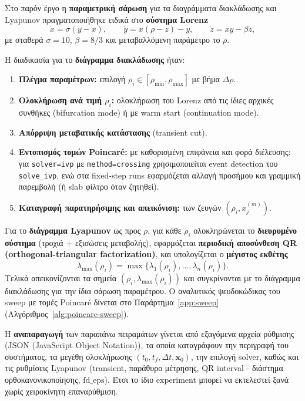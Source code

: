 \documentclass[11pt,a4paper]{report}
\begin{document}
Στο παρόν έργο η \textbf{παραμετρική σάρωση} για τα διαγράμματα διακλάδωσης και Lyapunov
πραγματοποιήθηκε ειδικά στο \textbf{σύστημα Lorenz}
\begin{equation}
\dot{x}=\sigma(y-x),
\qquad
\dot{y}=x(\rho-z)-y,
\qquad
\dot{z}=xy-\beta z,
\end{equation}
με σταθερά $\sigma=10$, $\beta=8/3$ και μεταβαλλόμενη παράμετρο το $\rho$.

Η διαδικασία για το \textbf{διάγραμμα διακλάδωσης} ήταν:
\begin{enumerate}
  \item \textbf{Πλέγμα παραμέτρων:} επιλογή $\rho_i\in[\rho_{\min},\rho_{\max}]$ με βήμα $\Delta\rho$.
  \item \textbf{Ολοκλήρωση ανά τιμή $\rho_i$:} ολοκλήρωση του Lorenz από τις ίδιες αρχικές συνθήκες (bifurcation mode) ή με warm start (continuation mode).
  \item \textbf{Απόρριψη μεταβατικής κατάστασης} (transient cut).
  \item \textbf{Εντοπισμός τομών Poincar\'e:} με καθορισμένη επιφάνεια και φορά διέλευσης: για \texttt{solver=ivp} με \texttt{method=crossing} χρησιμοποιείται event detection του \texttt{solve\_ivp}, ενώ στα fixed-step runs εφαρμόζεται αλλαγή προσήμου και γραμμική παρεμβολή (ή slab φίλτρο όταν ζητηθεί).
  \item \textbf{Καταγραφή παρατηρήσιμης και απεικόνιση:} των ζευγών $(\rho_i, x_j^{(m)})$.
\end{enumerate}

Για το \textbf{διάγραμμα Lyapunov} ως προς $\rho$, για κάθε $\rho_i$ ολοκληρώνεται το
\textbf{διευρυμένο σύστημα} (τροχιά + εξισώσεις μεταβολής), εφαρμόζεται \textbf{περιοδική αποσύνθεση QR (orthogonal-triangular factorization)},
και υπολογίζεται ο \textbf{μέγιστος εκθέτης}
\begin{equation}
\lambda_{\max}(\rho_i)=\max\{\lambda_1(\rho_i),\dots,\lambda_n(\rho_i)\}.
\end{equation}
Τελικά απεικονίζονται τα σημεία $(\rho_i,\lambda_{\max}(\rho_i))$ και συγκρίνονται
με το διάγραμμα διακλάδωσης για την ίδια σάρωση παραμέτρου.
Ο αναλυτικός ψευδοκώδικας του sweep με τομές Poincar\'e δίνεται στο
Παράρτημα~\ref{app:sweep} (Αλγόριθμος~\ref{alg:poincare-sweep}).

Η \textbf{αναπαραγωγή} των παραπάνω πειραμάτων γίνεται από εξαγόμενα αρχεία
ρύθμισης (JSON (JavaScript Object Notation)), τα οποία καταγράφουν την περιγραφή του συστήματος,
τα μεγέθη ολοκλήρωσης $(t_0,t_f,\Delta t,\mathbf{x}_0)$, την επιλογή solver,
καθώς και τις ρυθμίσεις Lyapunov (transient, παράθυρο μέτρησης, QR interval - διάστημα ορθοκανονικοποίησης,
$\mathrm{fd\_eps}$). Έτσι το ίδιο experiment μπορεί να εκτελεστεί ξανά
χωρίς χειροκίνητη επαναρύθμιση.
\end{document}
